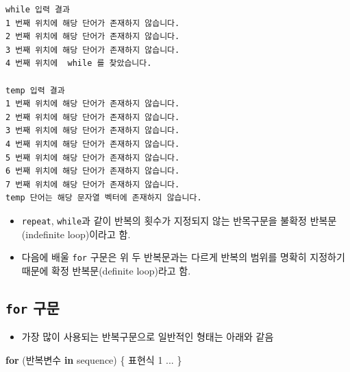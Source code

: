 \documentclass[
  11pt,
]{krantz}
\makeatletter
\newenvironment{Shaded}{\begin{snugshade}}{\end{snugshade}}
\newcommand{\ControlFlowTok}[1]{\textcolor[rgb]{0.27,0.27,0.27}{\textbf{#1}}}
\newcommand{\DecValTok}[1]{\textcolor[rgb]{0.06,0.06,0.06}{#1}}
\newcommand{\NormalTok}[1]{#1}
\providecommand{\tightlist}{%
  \setlength{\itemsep}{0pt}\setlength{\parskip}{0pt}}
\newenvironment{kframe}{%
\medskip{}
\setlength{\fboxsep}{.8em}
 \def\at@end@of@kframe{}%
 \ifinner\ifhmode%
  \def\at@end@of@kframe{\end{minipage}}%
  \begin{minipage}{\columnwidth}%
 \fi\fi%
 \def\FrameCommand##1{\hskip\@totalleftmargin \hskip-\fboxsep
 \colorbox{shadecolor}{##1}\hskip-\fboxsep
     \hskip-\linewidth \hskip-\@totalleftmargin \hskip\columnwidth}%
 \MakeFramed {\advance\hsize-\width
   \@totalleftmargin\z@ \linewidth\hsize
   \@setminipage}}%
 {\par\unskip\endMakeFramed%
 \at@end@of@kframe}
\newenvironment{rmdblock}[1]
  {
  \begin{itemize}
  \renewcommand{\labelitemi}{
    \raisebox{-.7\height}[0pt][0pt]{
      {\setkeys{Gin}{width=3em,keepaspectratio}\texttt{[image: images/\#1]}}
    }
  }
  \setlength{\fboxsep}{1em}
  \begin{kframe}
  \item
  }
  {
  \end{kframe}
  \end{itemize}
  }
\newenvironment{rmdnote}
  {\begin{rmdblock}{note}}
  {\end{rmdblock}}
\makeatother
\begin{document}
\begin{verbatim}
while 입력 결과
1 번째 위치에 해당 단어가 존재하지 않습니다.
2 번째 위치에 해당 단어가 존재하지 않습니다.
3 번째 위치에 해당 단어가 존재하지 않습니다.
4 번째 위치에  while 를 찾았습니다.

temp 입력 결과
1 번째 위치에 해당 단어가 존재하지 않습니다.
2 번째 위치에 해당 단어가 존재하지 않습니다.
3 번째 위치에 해당 단어가 존재하지 않습니다.
4 번째 위치에 해당 단어가 존재하지 않습니다.
5 번째 위치에 해당 단어가 존재하지 않습니다.
6 번째 위치에 해당 단어가 존재하지 않습니다.
7 번째 위치에 해당 단어가 존재하지 않습니다.
temp 단어는 해당 문자열 벡터에 존재하지 않습니다.
\end{verbatim}

\footnotesize

\begin{rmdnote}
\begin{itemize}
\tightlist
\item
  \texttt{repeat}, \texttt{while}과 같이 반복의 횟수가 지정되지 않는 반목구문을 불확정 반복문(indefinite loop)이라고 함.
\item
  다음에 배울 \texttt{for} 구문은 위 두 반복문과는 다르게 반복의 범위를 명확히 지정하기 때문에 확정 반복문(definite loop)라고 함.
\end{itemize}
\end{rmdnote}

\normalsize

\hypertarget{for-uxad6cuxbb38}{%
\subsection{\texorpdfstring{\textbf{\texttt{for} 구문}}{for 구문}}\label{for-uxad6cuxbb38}}

\begin{itemize}
\tightlist
\item
  가장 많이 사용되는 반복구문으로 일반적인 형태는 아래와 같음
\end{itemize}

\footnotesize

\begin{Shaded}
\begin{Highlighting}[]
\ControlFlowTok{for}\NormalTok{ (반복변수 }\ControlFlowTok{in}\NormalTok{ sequence) \{}
\NormalTok{  표현식 }\DecValTok{1}
\NormalTok{  ...}
\NormalTok{\}}
\end{Highlighting}
\end{Shaded}

\normalsize
\end{document}
